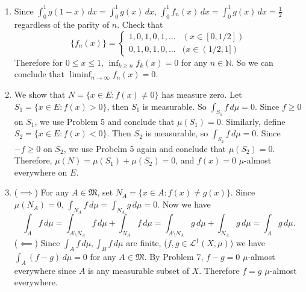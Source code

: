 \documentclass[12pt]{report}
\newcommand{\numl}[1]{\item[\large\textbf{\sffamily #1.}]}
\newcommand{\mf}[1]{\mathfrak{#1}}
\newcommand{\mc}[1]{\mathcal{#1}}
\newcommand{\bs}{\setminus}
\newcommand{\ra}{\rightarrow}
\newcommand{\N}{\mathbb{N}}
\renewcommand{\d}[1]{\,d{#1}}
\begin{document}
\begin{enumerate}
    \numl{6} Since \(\int_0^1 g(1-x) \d{x} = \int_0^1 g(x)\d{x}\), \(\int_0^1 f_n(x) \d{x} = \int_0^1 g(x) \d{x} = \frac{1}{2}\) regardless of the parity of \(n\). Check that
    \[
        \{f_n(x)\} = \begin{cases}
            1, 0, 1, 0, 1, \dots & (x \in [0, 1/2]) \\
            0, 1, 0, 1, 0, \dots & (x \in (1/2, 1])
        \end{cases}
    \]
    Therefore for \(0\leq x\leq 1\), \(\inf_{k\geq n} f_k (x) = 0\) for any \(n\in \N\). So we can conclude that \(\liminf_{n \ra \infty} f_n(x) = 0\).

    \numl{7} We show that \(N = \{x \in E : f(x) \neq 0\}\) has measure zero. Let \(S_1 = \{x \in E: f(x) > 0\}\), then \(S_1\) is measurable. So \(\int_{S_1} f \d{\mu} = 0\). Since \(f\geq 0\) on \(S_1\), we use {\sffamily Problem 5} and conclude that \(\mu(S_1) = 0\). Similarly, define \(S_2 = \{x \in E : f(x) < 0\}\). Then \(S_2\) is measurable, so \(\int_{S_2} f \d{\mu} = 0\). Since \(-f \geq 0\) on \(S_2\), we use {\sffamily Probelm 5} again and conclude that \(\mu(S_2) = 0\). Therefore, \(\mu(N) = \mu(S_1) + \mu(S_2) = 0\), and \(f(x) = 0\) \(\mu\)-almost everywhere on \(E\).

    \pagebreak

    \numl{8} {\sffamily (\(\implies\))} For any \(A \in \mf{M}\), set \(N_A = \{x \in A : f(x) \neq g(x)\}\). Since \(\mu(N_A) = 0\), \(\int_{N_A} f \d{\mu} = \int_{N_A} g \d{\mu} = 0\). Now we have
    \[
        \int_A f\d{\mu} = \int_{A \bs N_A} f \d{\mu} + \int_{N_A} f \d{\mu} = \int_{A \bs N_A} g \d{\mu} + \int_{N_A} g \d{\mu} = \int_A g\d{\mu}.
    \]
    {\sffamily (\(\impliedby\))} Since \(\int_A f \d{\mu}, \int_B f \d{\mu}\) are finite, (\(f, g \in \mc{L}^{1}(X, \mu)\)) we have \(\int_{A} (f-g) \d{\mu} = 0\) for any \(A \in \mf{M}\). By {\sffamily Problem 7}, \(f - g = 0\) \(\mu\)-almost everywhere since \(A\) is any measurable subset of \(X\). Therefore \(f = g\) \(\mu\)-almost everywhere.
\end{enumerate}
\end{document}

